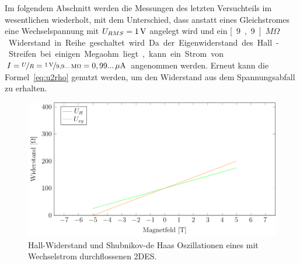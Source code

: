 
Im folgendem Abschnitt werden die Messungen des letzten Versuchteils im wesentlichen wiederholt, mit dem Unterschied, dass anstatt eines Gleichstromes eine Wechselspannung mit $U_{RMS}=\unit[1]{V}$ angelegt wird und ein \unit[9,9...]{$M\Omega$} Widerstand in Reihe geschaltet wird. Da der Eigenwiderstand des Hall-Streifen bei einigen Megaohm liegt, kann ein Strom von $I=\nicefrac{U}{R}=\nicefrac{\unit[1]{V}}{\unit[9,9...]{M\Omega}}=\unit[0,99...]{\mu A}$ angenommen werden. Erneut kann die Formel~\eqref{eq:u2rho} genutzt werden, um den Widerstand aus dem Spannungsabfall zu erhalten.


\begin{figure}[h]
	\centering
	\includegraphics{graphs/ac/full_range.pdf}
	\caption[Gleichstrommessung im maximalen Magnetfeldbereich]{
		Hall-Widerstand und Shubnikov-de Haas Oszillationen eines mit Wechselstrom durchflossenen 2DES.
	}
	\label{fig:full_range_ac}
\end{figure}